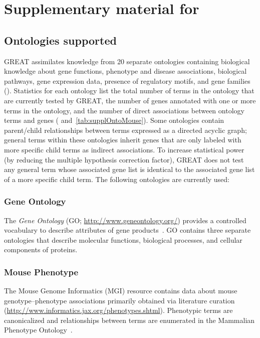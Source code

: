 \chapter{Supplementary material for }
\label{chap:greatSuppl}

\section{Ontologies supported}
\label{XOntologies}
GREAT assimilates knowledge from 20 separate ontologies containing biological
knowledge about gene functions, phenotype and disease associations,
biological pathways, gene expression data, presence of regulatory motifs, and
gene families ().
Statistics for each ontology list the total number of terms in the ontology
that are currently tested by GREAT, the number of genes
annotated with one or more terms in the ontology, and the number of direct
associations between ontology terms and genes (
and~\ref{tab:supplOntoMouse}).  Some ontologies contain parent/child
relationships between terms expressed as a directed acyclic graph; general
terms within these ontologies inherit genes that are only labeled with more
specific child terms as indirect associations.
To increase statistical power (by reducing the multiple hypothesis correction factor),
GREAT does not test any general term whose associated gene list is
identical to the associated gene list of a more specific child term.  The
following ontologies are currently used:

\subsection{Gene Ontology}
The \emph{Gene Ontology} (GO; \url{http://www.geneontology.org/}) provides a controlled vocabulary to describe attributes of
gene products~\citep{Ashburner2000}.  GO contains three separate ontologies that describe molecular functions, biological
processes, and cellular components of proteins.

\subsection{Mouse Phenotype}
The Mouse Genome Informatics (MGI) resource contains data about mouse
genotype--phenotype associations primarily obtained via
literature curation~\citep{Blake2009,Bult2008}
(\url{http://www.informatics.jax.org/phenotypes.shtml}). Phenotypic terms are
canonicalized and relationships between terms are enumerated in the Mammalian
Phenotype Ontology~\citep{Smith2005}.

